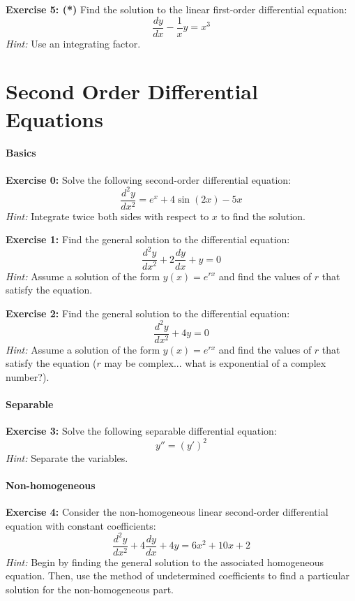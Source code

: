 \documentclass[]{article}
\begin{document}
	\textbf{Exercise 5: (*)}
	Find the solution to the linear first-order differential equation:
	\[
	\frac{dy}{dx} - \frac{1}{x}y = x^3
	\]
	\textit{Hint:} Use an integrating factor.
	
	
	
	\section{Second Order Differential Equations}
	\paragraph{Basics}\mbox{}
	
	\textbf{Exercise 0:}
	Solve the following second-order differential equation:
	\[
	\frac{d^2y}{dx^2} = e^x + 4\sin(2x) - 5x
	\]
	\textit{Hint:} Integrate twice both sides with respect to \(x\) to find the solution.
	
	\textbf{Exercise 1:}
	Find the general solution to the differential equation:
	\[
	\frac{d^2y}{dx^2} + 2\frac{dy}{dx} + y = 0
	\]
	\textit{Hint:} Assume a solution of the form \(y(x) = e^{rx}\) and find the values of \(r\) that satisfy the equation.
	
	\textbf{Exercise 2:}
	Find the general solution to the differential equation:
	\[
	\frac{d^2y}{dx^2} + 4y = 0
	\]
	\textit{Hint:} Assume a solution of the form \(y(x) = e^{rx}\) and find the values of \(r\) that satisfy the equation ($r$ may be complex... what is exponential of a complex number?).
	
	\paragraph{Separable}\mbox{}
	
	\textbf{Exercise 3:}
	Solve the following separable differential equation:
	$$y'' = (y')^2$$
	\textit{Hint:} Separate the variables.
	
	\paragraph{Non-homogeneous}\mbox{}
	
	\textbf{Exercise 4:}
	Consider the non-homogeneous linear second-order differential equation with constant coefficients:
	\[
	\frac{d^2y}{dx^2} + 4\frac{dy}{dx} + 4y = 6x^2 + 10x + 2
	\]
	\textit{Hint:} Begin by finding the general solution to the associated homogeneous equation. Then, use the method of undetermined coefficients to find a particular solution for the non-homogeneous part.
	
\end{document}
